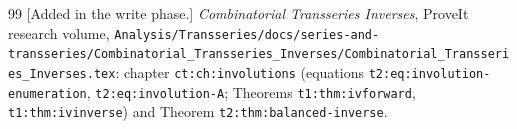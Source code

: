 \documentclass[11pt,letterpaper]{article}
\theoremstyle{remark}\newtheorem{remark}[theorem]{Remark}
\begin{document}
\begin{thebibliography}{99}
 [Added in the write phase.] \emph{Combinatorial Transseries Inverses}, ProveIt research volume, \texttt{Analysis/\allowbreak Transseries/\allowbreak docs/\allowbreak series-and-transseries/\allowbreak Combinatorial\_Transseries\_Inverses/\allowbreak Combinatorial\_Transseries\_Inverses.tex}: chapter \texttt{ct:ch:involutions} (equations \texttt{t2:eq:involution-enumeration}, \texttt{t2:eq:involution-A}; Theorems \texttt{t1:thm:ivforward}, \texttt{t1:thm:ivinverse}) and Theorem \texttt{t2:thm:balanced-inverse}.
\end{thebibliography}
\end{document}
